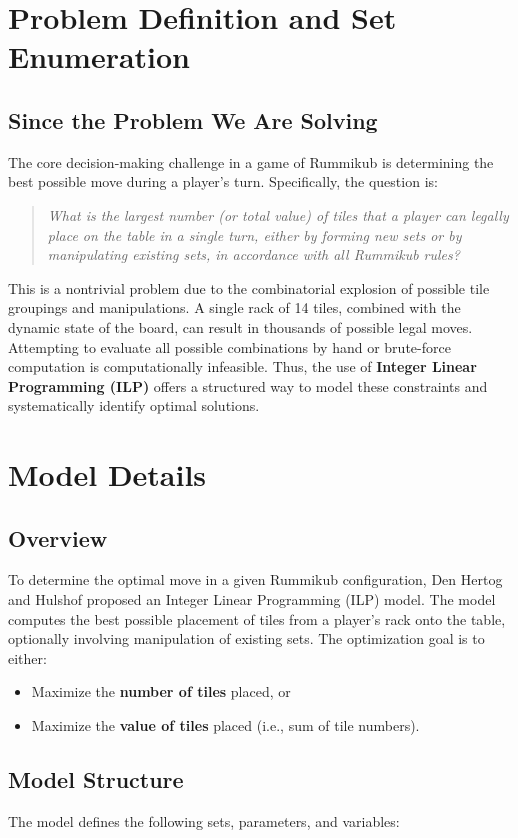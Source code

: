 \documentclass[11pt,letterpaper]{article}
\begin{document}
\section*{Problem Definition and Set Enumeration}
\subsection*{Since the Problem We Are Solving}
The core decision-making challenge in a game of Rummikub is determining the best possible move during a player's turn. Specifically, the question is:

\begin{quote}
    \emph{What is the largest number (or total value) of tiles that a player can legally place on the table in a single turn, either by forming new sets or by manipulating existing sets, in accordance with all Rummikub rules?}
\end{quote}

This is a nontrivial problem due to the combinatorial explosion of possible tile groupings and manipulations. A single rack of 14 tiles, combined with the dynamic state of the board, can result in thousands of possible legal moves. Attempting to evaluate all possible combinations by hand or brute-force computation is computationally infeasible. Thus, the use of \textbf{Integer Linear Programming (ILP)} offers a structured way to model these constraints and systematically identify optimal solutions.

\section*{Model Details}
\subsection*{Overview}
To determine the optimal move in a given Rummikub configuration, Den Hertog and Hulshof proposed an Integer Linear Programming (ILP) model. The model computes the best possible placement of tiles from a player's rack onto the table, optionally involving manipulation of existing sets. The optimization goal is to either:
\begin{itemize}
    \item Maximize the \textbf{number of tiles} placed, or
    \item Maximize the \textbf{value of tiles} placed (i.e., sum of tile numbers).
\end{itemize}

\subsection*{Model Structure}
The model defines the following sets, parameters, and variables:
\end{document}
